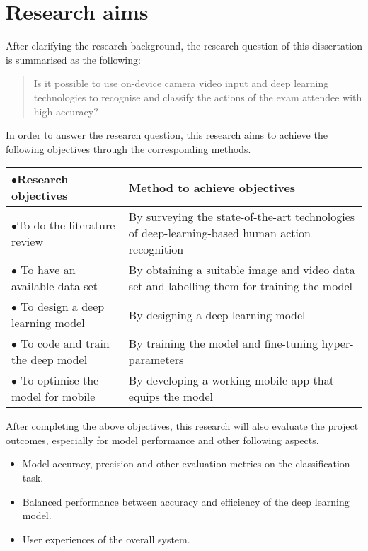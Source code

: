 \section{Research aims}
\label{sec:Research aims}
After clarifying the research background, the research question of this dissertation is summarised as the following:

\begin{quote}
    Is it possible to use on-device camera video input and deep learning technologies to recognise and classify the actions of the exam attendee with high accuracy?
\end{quote}

In order to answer the research question, this research aims to achieve the following objectives through the corresponding methods.

\begin{longtable}{>{\hspace*{-0.3cm}$\bullet$\hspace*{0.2cm}}p{}p{}}
\textbf{Research objectives} & \textbf{Method to achieve objectives} \\ \hline
To do the literature review & By surveying the state-of-the-art technologies of deep-learning-based human action recognition \\ \hline
To have an available data set & By obtaining a suitable image and video data set and labelling them for training the model \\ \hline
To design a deep learning model & By designing a deep learning model \\ \hline
To code and train the deep model & By training the model and fine-tuning hyper-parameters \\ \hline
To optimise the model for mobile & By developing a working mobile app that equips the model \\ 
\end{longtable}

After completing the above objectives, this research will also evaluate the project outcomes, especially for model performance and other following aspects.

\begin{itemize}
    \item Model accuracy, precision and other evaluation metrics on the classification task.
    \item Balanced performance between accuracy and efficiency of the deep learning model.
    \item User experiences of the overall system.
\end{itemize}
